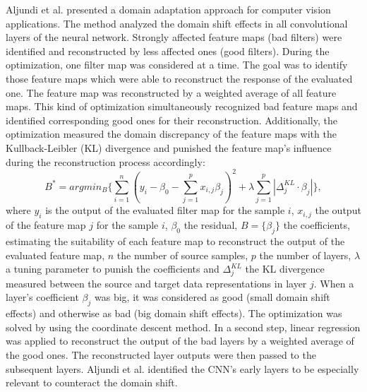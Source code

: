 Aljundi et al. \cite{Aljundi2016} presented a domain adaptation approach for computer vision applications. The method analyzed the domain shift effects in all convolutional layers of the neural network. Strongly affected feature maps (bad filters) were identified and reconstructed by less affected ones (good filters). During the optimization, one filter map was considered at a time. The goal was to identify those feature maps which were able to reconstruct the response of the evaluated one. The feature map was reconstructed by a weighted average of all feature maps. This kind of optimization simultaneously recognized bad feature maps and identified corresponding good ones for their reconstruction. Additionally, the optimization measured the domain discrepancy of the feature maps with the Kullback-Leibler (KL) divergence and punished the feature map's influence during the reconstruction process accordingly:  
\begin{equation}
    B^{*} = argmin_{B} \{ \sum_{i=1}^{n}( y_{i}-\beta_{0}-\sum_{j=1}^{p}x_{i,j}\beta_{j})^{2} + \lambda \sum_{j=1}^{p}|\Delta_{j}^{KL}\cdot \beta_{j}| \},
\end{equation}
where $y_{i}$ is the output of the evaluated filter map for the sample $i$, $x_{i,j}$ the output of the feature map $j$ for the sample $i$, $\beta_{0}$ the residual, $B = \{\beta_{j}\}$ the coefficients, estimating the suitability of each feature map to reconstruct the output of the evaluated feature map, $n$ the number of source samples, $p$ the number of layers, $\lambda$ a tuning parameter to punish the coefficients and $\Delta_{j}^{KL}$ the KL divergence measured between the source and target data representations in layer $j$. When a layer's coefficient  $\beta_{j}$ was big, it was considered as good (small domain shift effects) and otherwise as bad (big domain shift effects). The optimization was solved by using the coordinate descent method. In a second step, linear regression was applied to reconstruct the output of the bad layers by a weighted average of the good ones. The reconstructed layer outputs were then passed to the subsequent layers. Aljundi et al. \cite{Aljundi2016} identified the CNN's early layers to be especially relevant to counteract the domain shift.

